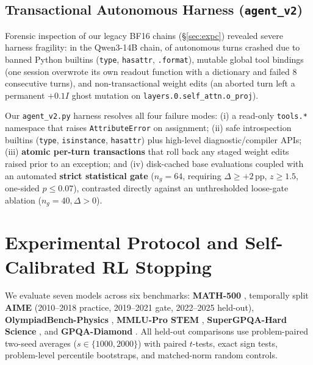 \documentclass[10pt]{article}
\begin{document}
\subsection{Transactional Autonomous Harness (\texttt{agent\_v2})}
Forensic inspection of our legacy BF16 chains (\S\ref{sec:expc}) revealed severe harness fragility: in the Qwen3-14B chain, \LegacyFourteenErr{} of autonomous turns crashed due to banned Python builtins (\texttt{type}, \texttt{hasattr}, \texttt{.format}), mutable global tool bindings (one session overwrote its own readout function with a dictionary and failed 8 consecutive turns), and non-transactional weight edits (an aborted turn left a permanent $+0.1I$ ghost mutation on \texttt{layers.0.self\_attn.o\_proj}).

Our \texttt{agent\_v2.py} harness resolves all four failure modes: (i) a read-only \texttt{tools.*} namespace that raises \texttt{AttributeError} on assignment; (ii) safe introspection builtins (\texttt{type}, \texttt{isinstance}, \texttt{hasattr}) plus high-level diagnostic/compiler APIs; (iii) \textbf{atomic per-turn transactions} that roll back any staged weight edits raised prior to an exception; and (iv) disk-cached base evaluations coupled with an automated \textbf{strict statistical gate} ($n_g=64$, requiring $\Delta \ge +2$\,pp, $z \ge 1.5$, one-sided $p \le 0.07$), contrasted directly against an unthresholded loose-gate ablation ($n_g=40, \Delta > 0$).

\section{Experimental Protocol and Self-Calibrated RL Stopping}
\label{sec:calib}

We evaluate seven models across six benchmarks: \textbf{MATH-500} \citep{hendrycks2021math,lightman2023verify}, temporally split \textbf{AIME} (2010--2018 practice, 2019--2021 gate, 2022--2025 held-out), \textbf{OlympiadBench-Physics} \citep{he2024olympiadbench}, \textbf{MMLU-Pro STEM} \citep{wang2024mmlupro}, \textbf{SuperGPQA-Hard Science} \citep{du2025supergpqa}, and \textbf{GPQA-Diamond} \citep{rein2023gpqa}. All held-out comparisons use problem-paired two-seed averages ($s\in\{1000,2000\}$) with paired $t$-tests, exact sign tests, problem-level percentile bootstraps, and matched-norm random controls.
\end{document}
